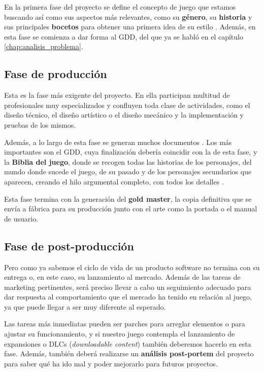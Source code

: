 En la primera fase del proyecto se define el concepto de juego que estamos buscando así como sus aspectos más relevantes, como su \textbf{género}, su \textbf{historia} y sus principales \textbf{bocetos} para obtener una primera idea de su estilo \cite{rou-05}. Además, en esta fase se comienza a dar forma al \acs{GDD}, del que ya se habló en el capítulo \ref{chap:analisis_problema}.

\subsection{Fase de producción}

Esta es la fase más exigente del proyecto. En ella participan multitud de profesionales muy especializados y confluyen toda clase de actividades, como el diseño técnico, el diseño artístico o el diseño mecánico y la implementación y pruebas de los mismos. 

Además, a lo largo de esta fase se generan muchos documentos . Los más importantes son el \acs{GDD}, cuya finalización debería coincidir con la de esta fase, y la \textbf{Biblia del juego}, donde se recogen todas las historias de los personajes, del mundo donde sucede el juego, de su pasado y de los personajes secundarios que aparecen, creando el hilo argumental completo, con todos los detalles \cite{man-14}.

Esta fase termina con la generación del \textbf{gold master}, la copia definitiva que se envía a fábrica para su producción junto con el arte como la portada o el manual de usuario.

\subsection{Fase de post-producción}

Pero como ya sabemos el ciclo de vida de un producto software no termina con su entrega o, en este caso, su lanzamiento al mercado. Además de las tareas de marketing pertinentes, será preciso llevar a cabo un seguimiento adecuado para dar respuesta al comportamiento que el mercado ha tenido en relación al juego, ya que puede llegar a ser muy diferente al esperado.

Las tareas más inmediatas pueden ser parches para arreglar elementos o para ajustar su funcionamiento, y si nuestro juego contempla el lanzamiento de expansiones o DLCs (\textit{downloadable content}) también deberemos hacerlo en esta fase. Además, también deberá realizarse un \textbf{análisis post-portem} del proyecto para saber qué ha ido mal y poder mejorarlo para futuros proyectos.

